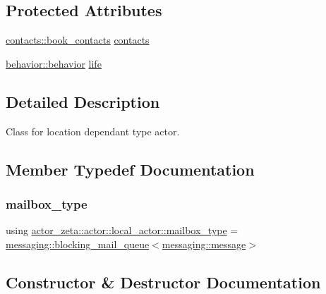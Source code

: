 \subsection*{Protected Attributes}
\begin{DoxyCompactItemize}
\item 
\hyperlink{classactor__zeta_1_1contacts_1_1book__contacts}{contacts\+::book\+\_\+contacts} \hyperlink{classactor__zeta_1_1actor_1_1local__actor_a4fda781631b136f3ed0adcea9fa69cc4}{contacts}
\item 
\hyperlink{classactor__zeta_1_1behavior_1_1behavior}{behavior\+::behavior} \hyperlink{classactor__zeta_1_1actor_1_1local__actor_a301dcbe374e76903da9cb44c368ac587}{life}
\end{DoxyCompactItemize}


\subsection{Detailed Description}
Class for location dependant type actor. 

\subsection{Member Typedef Documentation}
\mbox{\label{classactor__zeta_1_1actor_1_1local__actor_aacff3ec6e7196584dd640b8d57fa020e}} 
\subsubsection{\texorpdfstring{mailbox\+\_\+type}{mailbox\_type}}
{\footnotesize\ttfamily using \hyperlink{classactor__zeta_1_1actor_1_1local__actor_aacff3ec6e7196584dd640b8d57fa020e}{actor\+\_\+zeta\+::actor\+::local\+\_\+actor\+::mailbox\+\_\+type} =  \hyperlink{classactor__zeta_1_1messaging_1_1blocking__mail__queue}{messaging\+::blocking\+\_\+mail\+\_\+queue}$<$\hyperlink{classactor__zeta_1_1messaging_1_1message}{messaging\+::message}$>$}



\subsection{Constructor \& Destructor Documentation}
\mbox{\label{classactor__zeta_1_1actor_1_1local__actor_adb1c7cd995fef7b2c3199fa07df6dfca}} 
